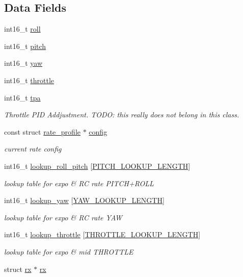 \subsection*{Data Fields}
\begin{DoxyCompactItemize}
\item 
int16\+\_\+t \hyperlink{structrc__command_ac21b64ef2f07da324254c16d8928f50c}{roll}
\item 
int16\+\_\+t \hyperlink{structrc__command_a241a6c58c590a3d43c43e269fa8d9023}{pitch}
\item 
int16\+\_\+t \hyperlink{structrc__command_a6992103b0952de7cfc5a7dd16ff57f6f}{yaw}
\item 
int16\+\_\+t \hyperlink{structrc__command_ac266979072e78c4e3d2919e661e76b30}{throttle}
\item 
int16\+\_\+t \hyperlink{structrc__command_a9ab8d4fed429491a21dd67b621eef9e7}{tpa}
\begin{DoxyCompactList}\small\item\em Throttle P\+I\+D Addjustment. T\+O\+D\+O\+: this really does not belong in this class. \end{DoxyCompactList}\item 
const struct \hyperlink{structrate__profile}{rate\+\_\+profile} $\ast$ \hyperlink{structrc__command_a2529fb1da9d636599d0f01450c6299fb}{config}
\begin{DoxyCompactList}\small\item\em current rate config \end{DoxyCompactList}\item 
int16\+\_\+t \hyperlink{structrc__command_a6cf67909a0d1e664b5f37cd5321063fa}{lookup\+\_\+roll\+\_\+pitch} \mbox{[}\hyperlink{rc__command_8h_aaa992d098655b44344d71c3249f84fc9}{P\+I\+T\+C\+H\+\_\+\+L\+O\+O\+K\+U\+P\+\_\+\+L\+E\+N\+G\+T\+H}\mbox{]}
\begin{DoxyCompactList}\small\item\em lookup table for expo \& R\+C rate P\+I\+T\+C\+H+\+R\+O\+L\+L \end{DoxyCompactList}\item 
int16\+\_\+t \hyperlink{structrc__command_af60e0994175fb159769d8e9e84e05d99}{lookup\+\_\+yaw} \mbox{[}\hyperlink{rc__command_8h_a8758cc0f95a7e77b5d09f4c03194df6b}{Y\+A\+W\+\_\+\+L\+O\+O\+K\+U\+P\+\_\+\+L\+E\+N\+G\+T\+H}\mbox{]}
\begin{DoxyCompactList}\small\item\em lookup table for expo \& R\+C rate Y\+A\+W \end{DoxyCompactList}\item 
int16\+\_\+t \hyperlink{structrc__command_a526d9456c67efe8f66373a4f8c5a99c8}{lookup\+\_\+throttle} \mbox{[}\hyperlink{rc__command_8h_a8cce32335257577e6259d5480adaf056}{T\+H\+R\+O\+T\+T\+L\+E\+\_\+\+L\+O\+O\+K\+U\+P\+\_\+\+L\+E\+N\+G\+T\+H}\mbox{]}
\begin{DoxyCompactList}\small\item\em lookup table for expo \& mid T\+H\+R\+O\+T\+T\+L\+E \end{DoxyCompactList}\item 
struct \hyperlink{structrx}{rx} $\ast$ \hyperlink{structrc__command_ae4f73933858f00ea36e7d355e776aa6c}{rx}
\end{DoxyCompactItemize}


